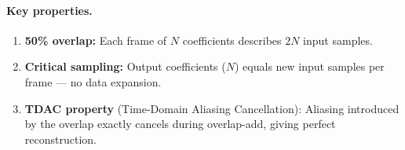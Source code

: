 \paragraph{Key properties.}
\begin{enumerate}[nosep]
  \item \textbf{50\% overlap:} Each frame of $N$ coefficients describes $2N$ input samples.
  \item \textbf{Critical sampling:} Output coefficients ($N$) equals new input samples per frame --- no data expansion.
  \item \textbf{TDAC property} (Time-Domain Aliasing Cancellation): Aliasing introduced by the overlap exactly cancels during overlap-add, giving perfect reconstruction.
\end{enumerate}

